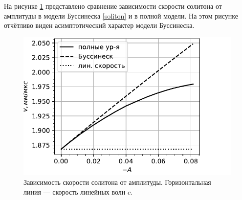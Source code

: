 \documentclass[12pt, a4paper]{article}
\begin{document}
На рисунке \ref{fig:sol_compare} представлено сравнение зависимости скорости солитона от амплитуды в модели Буссинеска \eqref{soliton} и в полной модели. На этом рисунке отчётливо виден асимптотический характер модели Буссинеска.
\begin{figure}[h!]
	\centering
	\includegraphics[width=0.53\linewidth]{figures/VelAmplSmall}
	\vspace{-2mm}
	\caption{Зависимость скорости солитона от амплитуды. Горизонтальная линия --- скорость линейных волн $c$.}
	\label{fig:sol_compare}
	\vspace{-3mm}
\end{figure}


\end{document}
